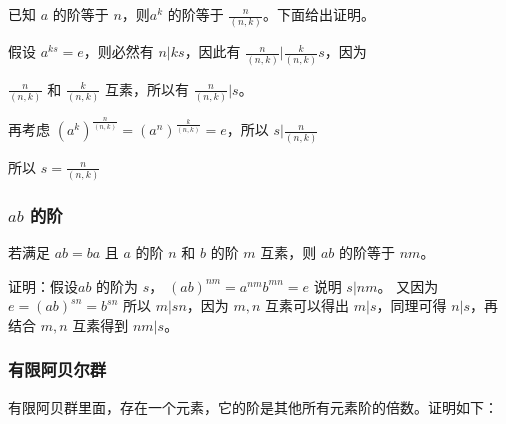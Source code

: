 已知 $a$ 的阶等于 $n$，则$a^k$ 的阶等于 $\frac{n}{(n,k)}$。下面给出证明。

假设 $a^{ks} = e$，则必然有 $n \vert ks$，因此有 $\frac{n}{(n,k)} \vert \frac{k}{(n,k)}s $，因为 

$\frac{n}{(n,k)}$ 和 $\frac{k}{(n,k)}$ 互素，所以有  $\frac{n}{(n,k)} \vert s$。

再考虑 $(a^k)^{\frac{n}{(n,k)}} = (a ^ {n})^{\frac{k}{(n,k)}} = e$，所以 $s \vert \frac{n}{(n,k)} $

所以 $s = \frac{n}{(n, k)}$


\subsubsection{$ab$ 的阶}

若满足 $ab = ba$ 且 $a$ 的阶 $n$ 和 $b$ 的阶 $m$ 互素，则 $ab$ 的阶等于 $nm$。

证明：假设$ab$ 的阶为 $s$， $(ab)^{nm} = a^{nm}b^{mn} = e$ 说明 $s \vert nm$。
又因为 $e = (ab)^{sn} = b^{sn}$ 所以 $m \vert sn$，因为 $m,n$ 互素可以得出 $m \vert s$，同理可得 $n \vert s$，再结合 $m,n $ 互素得到 $nm \vert s$。


\subsubsection{有限阿贝尔群}

有限阿贝群里面，存在一个元素，它的阶是其他所有元素阶的倍数。证明如下：


